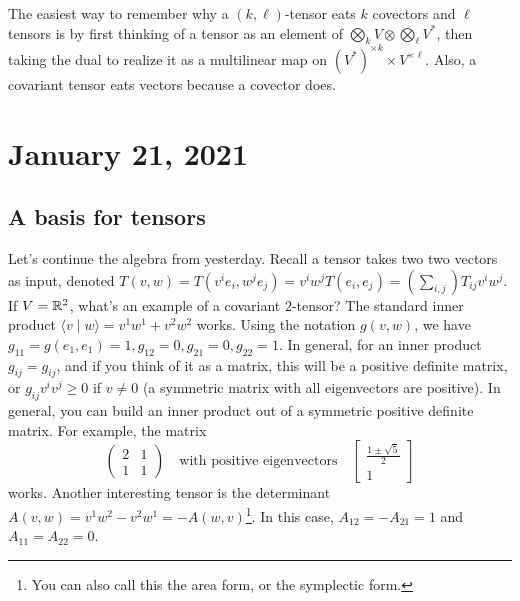 \begin{note}
    The easiest way to remember why a $(k,\ell)$-tensor eats $k$ covectors and $\ell$ tensors is by first thinking of a tensor as an element of $\bigotimes_k V\otimes \bigotimes _{\ell} V^*$, then taking the dual to realize it as a multilinear map on $(V^*)^{\times k}\times V^{\times \ell}$. Also, a covariant tensor eats vectors because a covector does.
\end{note}
\section{January 21, 2021}

\subsection{A basis for tensors}
Let's continue the algebra from yesterday. Recall a tensor takes two two vectors as input, denoted $T(v,w)=T(v^i e_i , w^j e_j )=v ^i  w ^j T (e_i , e_j )=\left( \sum _{i,j} \right) T_{ij}v^i w^{j}$. If $V=\mathbb{R}^2$, what's an example of a covariant $2$-tensor? The standard inner product $\langle v \mid w \rangle =v^1w^1+v^2w^2$ works. Using the notation $g(v,w)$, we have $g_{11}=g(e_1,e_1)=1, g_{12}=0, g_{21}=0, g_{22}=1$. In general, for an inner product $g_{ij}=g_{ij}$, and if you think of it as a matrix, this will be a positive definite matrix, or $g_{ij}v^i v^j \geq 0$ if $v\neq 0$ (a symmetric matrix with all eigenvectors are positive). In general, you can build an inner product out of a symmetric positive definite matrix. For example, the matrix \[
\begin{pmatrix}
    2 & 1 \\ 1 & 1 
\end{pmatrix} \quad \text{with positive eigenvectors} \quad
\begin{bmatrix}
    \frac{1\pm \sqrt{5} }{2}\\ 1
\end{bmatrix}
\] works. Another interesting tensor is the determinant $A(v,w)=v^1w^2-v^2w^1=-A(w,v)$\footnote{You can also call this the area form, or the symplectic form.}. In this case, $A_{12}=-A_{21}=1$ and $A_{11}=A_{22}=0$.

